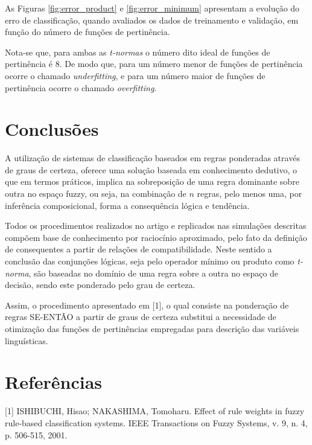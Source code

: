 \documentclass[12pt,a4paper]{article}
\numberwithin{equation}{section}
\begin{document}
As Figuras \ref{fig:error_product} e \ref{fig:error_minimum} apresentam a evolução do erro de classificação, quando avaliados os dados de treinamento e validação, em função do número de funções de pertinência.

Nota-se que, para ambas as \textit{t-normas} o número dito ideal de funções de pertinência é $8$. De modo que, para um número menor de funções de pertinência ocorre o chamado \textit{underfitting}, e para um número maior de funções de pertinência ocorre o chamado \textit{overfitting}.


\newpage
\section{Conclusões}

A utilização de sistemas de classificação baseados em regras ponderadas através de graus de certeza, oferece uma solução baseada em conhecimento dedutivo, o que em termos práticos, implica na sobreposição de uma regra dominante sobre outra no espaço fuzzy, ou seja, na combinação de $n$ regras, pelo menos uma, por inferência composicional, forma a consequência lógica e tendência.

Todos os procedimentos realizados no artigo e replicados nas simulações descritas compõem base de conhecimento por raciocínio aproximado, pelo fato da definição de consequentes a partir de relações de compatibilidade. Neste sentido a conclusão das conjunções lógicas, seja pelo operador mínimo ou produto como \textit{t-norma}, são baseadas no domínio de uma regra sobre a outra no espaço de decisão, sendo este ponderado pelo grau de certeza.

Assim, o procedimento apresentado em [1], o qual consiste na ponderação de regras SE-ENTÃO a partir de graus de certeza substitui a necessidade de otimização das funções de pertinências empregadas para descrição das variáveis linguísticas.
\newpage

\section*{Referências}
%

[1] ISHIBUCHI, Hisao; NAKASHIMA, Tomoharu. Effect of rule weights in fuzzy rule-based classification systems. IEEE Transactions on Fuzzy Systems, v. 9, n. 4, p. 506-515, 2001.
\end{document}
